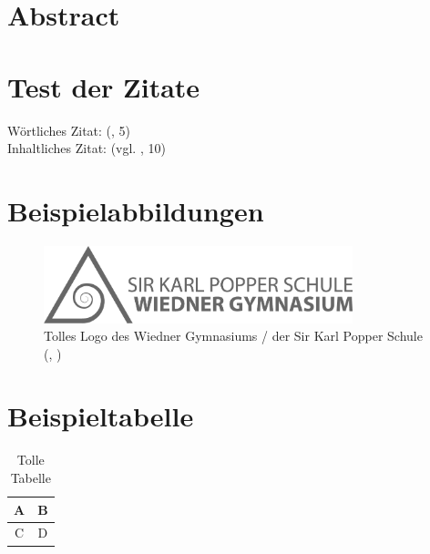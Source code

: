 \documentclass[12pt]{article}
\newcommand{\izit}[2]{(vgl. \cite{#1}, #2)}
\newcommand{\wzit}[2]{(\cite{#1}, #2)}
\renewcommand{\abstract}{\section*{Abstract}}
\begin{document}


\abstract
\clearpage
\tableofcontents
\clearpage

\section{Test der Zitate}
Wörtliches Zitat: \wzit{panganos14}{5} \\
Inhaltliches Zitat: \izit{panganos14}{10}

\section{Beispielabbildungen}
\begin{figure}[h!]
    \includegraphics[width=0.8\textwidth]{logo.png}
    \caption{Tolles Logo des Wiedner Gymnasiums / der Sir Karl Popper Schule \wzit{author_fig}{}}
\end{figure}

\section{Beispieltabelle}
\begin{table}[h!]
    \centering
    \begin{tabular}{|c|c|}
        A & B \\ \hline
        C & D
    \end{tabular}
    \caption{Tolle Tabelle}
\end{table}


\clearpage
\printbibliography[title=\section{Literaturverzeichnis}]
\listoffigures
\listoftables
\end{document}
